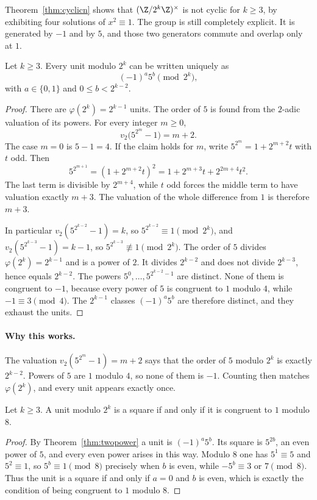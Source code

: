 Theorem~\ref{thm:cyclicn} shows that $(\Z/2^k\Z)^\times$ is not cyclic for $k\ge3$, by exhibiting four solutions of $x^2\equiv1$. The group is still completely explicit. It is generated by $-1$ and by $5$, and those two generators commute and overlap only at $1$.

\begin{theorem}\label{thm:twopower}
Let $k\ge3$. Every unit modulo $2^k$ can be written uniquely as
\[
(-1)^a5^b\pmod{2^k},
\]
with $a\in\{0,1\}$ and $0\le b<2^{k-2}$.
\end{theorem}
\begin{proof}
There are $\varphi(2^k)=2^{k-1}$ units. The order of $5$ is found from the $2$-adic valuation of its powers. For every integer $m\ge0$,
\[
v_2\bigl(5^{2^m}-1\bigr)=m+2.
\]
The case $m=0$ is $5-1=4$. If the claim holds for $m$, write $5^{2^m}=1+2^{m+2}t$ with $t$ odd. Then
\[
5^{2^{m+1}}=(1+2^{m+2}t)^2=1+2^{m+3}t+2^{2m+4}t^2.
\]
The last term is divisible by $2^{m+4}$, while $t$ odd forces the middle term to have valuation exactly $m+3$. The valuation of the whole difference from $1$ is therefore $m+3$.

In particular $v_2(5^{2^{k-2}}-1)=k$, so $5^{2^{k-2}}\equiv1\pmod{2^k}$, and $v_2(5^{2^{k-3}}-1)=k-1$, so $5^{2^{k-3}}\not\equiv1\pmod{2^k}$. The order of $5$ divides $\varphi(2^k)=2^{k-1}$ and is a power of $2$. It divides $2^{k-2}$ and does not divide $2^{k-3}$, hence equals $2^{k-2}$. The powers $5^0,\dots,5^{2^{k-2}-1}$ are distinct. None of them is congruent to $-1$, because every power of $5$ is congruent to $1$ modulo $4$, while $-1\equiv3\pmod4$. The $2^{k-1}$ classes $(-1)^a5^b$ are therefore distinct, and they exhaust the units.
\end{proof}

\paragraph{Why this works.}
The valuation $v_2(5^{2^m}-1)=m+2$ says that the order of $5$ modulo $2^k$ is exactly $2^{k-2}$. Powers of $5$ are $1$ modulo $4$, so none of them is $-1$. Counting then matches $\varphi(2^k)$, and every unit appears exactly once.

\begin{corollary}\label{cor:mod8squares}
Let $k\ge3$. A unit modulo $2^k$ is a square if and only if it is congruent to $1$ modulo $8$.
\end{corollary}
\begin{proof}
By Theorem~\ref{thm:twopower} a unit is $(-1)^a5^b$. Its square is $5^{2b}$, an even power of $5$, and every even power arises in this way. Modulo $8$ one has $5^1\equiv5$ and $5^2\equiv1$, so $5^b\equiv1\pmod8$ precisely when $b$ is even, while $-5^b\equiv3$ or $7\pmod8$. Thus the unit is a square if and only if $a=0$ and $b$ is even, which is exactly the condition of being congruent to $1$ modulo $8$.
\end{proof}

